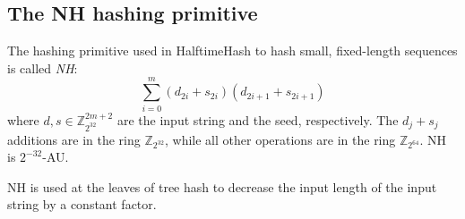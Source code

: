 \documentclass[runningheads]{llncs}
\newcommand{\ints}{\mathbb{Z}}
\begin{document}


\subsection{The NH hashing primitive}

The hashing primitive used in HalftimeHash to hash small, fixed-length sequences is called {\em NH}: \cite{umac}
\[
\sum_{i=0}^m (d_{2i} + s_{2i})(d_{2i+1} + s_{2i+1})
\]
where $d, s \in \ints_{2^{32}}^{2m+2}$ are the input string and the seed, respectively.
The $d_j + s_j$ additions are in the ring $\ints_{2^{32}}$, while all other operations are in the ring $\ints_{2^{64}}$.
NH is $2^{-32}$-AU.

NH is used at the leaves of tree hash to decrease the input length of the input string by a constant factor.



\end{document}
